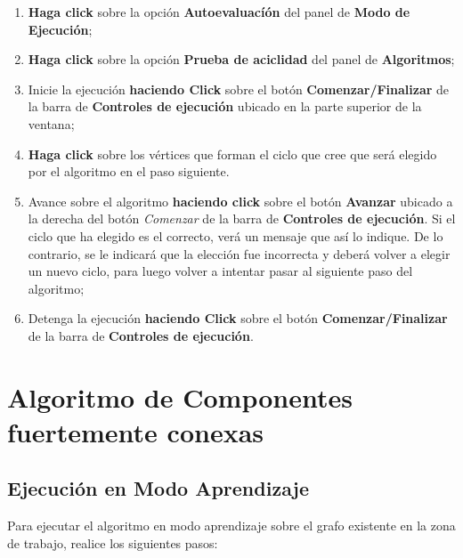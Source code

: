 \documentclass{book}
\begin{document}
\begin{enumerate}
	\itemsep=8pt \topsep=0pt \partopsep=0pt \parskip=0pt \parsep=0pt

	\item \textbf{Haga click} sobre la opción \textbf{Autoevaluacíón} del panel de \textbf{Modo de Ejecución};

	\item \textbf{Haga click} sobre la opción \textbf{Prueba de aciclidad} del panel de \textbf{Algoritmos};

	\item Inicie la ejecución \textbf{haciendo Click} sobre el botón \textbf{Comenzar/Finalizar} de la barra de \textbf{Controles de ejecución} ubicado en la parte superior de la ventana;

	\item \textbf{Haga click} sobre los vértices que forman el ciclo que cree que será elegido por el algoritmo en el paso siguiente.

	\item Avance sobre el algoritmo \textbf{haciendo click} sobre el botón \textbf{Avanzar} ubicado a la derecha del botón \textit{Comenzar} de la barra de \textbf{Controles de ejecución}. Si el ciclo que ha elegido es el correcto, verá un mensaje que así lo indique. De lo contrario, se le indicará que la elección fue incorrecta y deberá volver a elegir un nuevo ciclo, para luego volver a intentar pasar al siguiente paso del algoritmo;

	\item Detenga la ejecución \textbf{haciendo Click} sobre el botón \textbf{Comenzar/Finalizar} de la barra de \textbf{Controles de ejecución}.

\end{enumerate}
\medskip





%
%
\chapter{Algoritmo de Componentes fuertemente conexas}


\section{Ejecución en Modo Aprendizaje}

Para ejecutar el algoritmo en modo aprendizaje sobre el grafo existente en la zona de trabajo, realice los siguientes pasos:
\medskip
\end{document}
